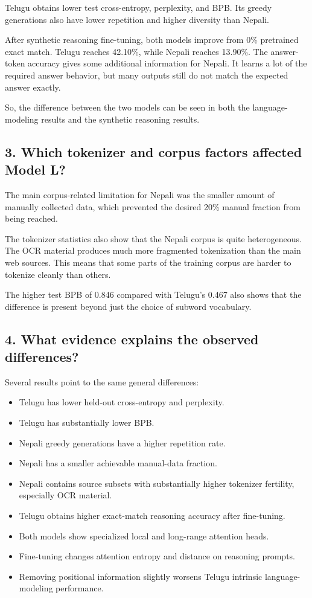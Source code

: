 \documentclass[10pt,a4paper]{article}
\begin{document}
Telugu obtains lower test cross-entropy, perplexity, and BPB. Its
greedy generations also have lower repetition and higher diversity
than Nepali.

After synthetic reasoning fine-tuning, both models improve from 0\%
pretrained exact match. Telugu reaches 42.10\%, while Nepali reaches
13.90\%. The answer-token accuracy gives some additional information
for Nepali. It learns a lot of the required answer behavior, but many
outputs still do not match the expected answer exactly.

So, the difference between the two models can be seen in both the
language-modeling results and the synthetic reasoning results.

\subsection{3. Which tokenizer and corpus factors affected Model L?}

The main corpus-related limitation for Nepali was the smaller amount
of manually collected data, which prevented the desired 20\% manual
fraction from being reached.

The tokenizer statistics also show that the Nepali corpus is quite
heterogeneous. The OCR material produces much more fragmented
tokenization than the main web sources. This means that some parts of
the training corpus are harder to tokenize cleanly than others.

The higher test BPB of 0.846 compared with Telugu's 0.467 also shows
that the difference is present beyond just the choice of subword
vocabulary.

\subsection{4. What evidence explains the observed differences?}

Several results point to the same general differences:

\begin{itemize}
    \item Telugu has lower held-out cross-entropy and perplexity.
    \item Telugu has substantially lower BPB.
    \item Nepali greedy generations have a higher repetition rate.
    \item Nepali has a smaller achievable manual-data fraction.
    \item Nepali contains source subsets with substantially higher
          tokenizer fertility, especially OCR material.
    \item Telugu obtains higher exact-match reasoning accuracy after
          fine-tuning.
    \item Both models show specialized local and long-range attention
          heads.
    \item Fine-tuning changes attention entropy and distance on
          reasoning prompts.
    \item Removing positional information slightly worsens Telugu
          intrinsic language-modeling performance.
\end{itemize}
\end{document}
